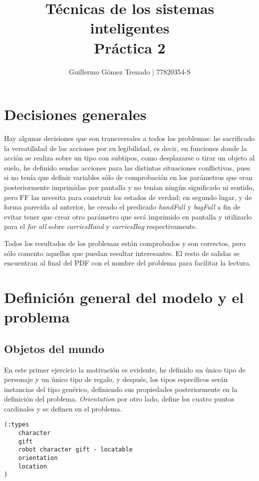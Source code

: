 \documentclass{article}
\title{Técnicas de los sistemas inteligentes\\
Práctica 2}
\author{Guillermo G\'omez Trenado | 77820354-S}
\begin{document}

\maketitle

\section*{Decisiones generales}
	
	Hay algunas decisiones que son transversales a todos los problemas: he sacrificado la versatilidad de las acciones por su legibilidad, es decir, en funciones donde la acción se realiza sobre un tipo con subtipos, como desplazarse o tirar un objeto al suelo, he definido sendas acciones para las distintas situaciones conflictivas, pues si no tenía que definir variables sólo de comprobación en los parámetros que eran posteriormente imprimidas por pantalla y no tenían ningún significado ni sentido, pero FF las necesita para construir los estados de verdad; en segundo lugar, y de forma parecida al anterior, he creado el predicado \emph{handFull} y \emph{bagFull} a fin de evitar tener que crear otro parámetro que será imprimido en pantalla y utilizarlo para el \emph{for all} sobre \emph{carriesHand} y \emph{carriesBag} respectivamente.
	
	Todos los resultados de los problemas están comprobados y son correctos, pero sólo comento aquellos que puedan resultar interesantes. El resto de salidas se encuentran al final del PDF con el nombre del problema para facilitar la lectura. 
	
\section{Definición general del modelo y el problema}

\subsection{Objetos del mundo}

	En este primer ejercicio la motivación es evidente, he definido un único tipo de personaje y un único tipo de regalo, y después, los tipos específicos serán instancias del tipo genérico, definiendo sus propiedades posteriormente en la definición del problema. \emph{Orientation} por otro lado, define los cuatro puntos cardinales y se definen en el problema.
	
\begin{lstlisting}
(:types
	character
	gift
	robot character gift - locatable
	orientation
	location
)
\end{lstlisting}
\end{document}
